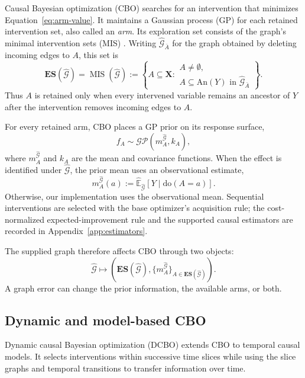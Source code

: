 \documentclass[twoside]{article}
\newcommand{\E}{\mathbb{E}}
\newcommand{\doo}{\mathrm{do}}
\newcommand{\An}{\mathrm{An}}
\newcommand{\CBO}{\textsc{CBO}}
\newcommand{\Gg}{\mathcal{G}}
\newcommand{\ES}{\mathbf{ES}}
\begin{document}
Causal Bayesian optimization (\CBO{}) \citep{agliettiCausalBayesianOptimization2020b} searches for an intervention that minimizes Equation~\eqref{eq:arm-value}. It maintains a Gaussian process (GP) for each retained intervention set, also called an \emph{arm}. Its exploration set consists of the graph's minimal intervention sets (MIS) \citep{leeStructuralCausalBandits}. Writing \(\widehat{\Gg}_{\bar A}\) for the graph obtained by deleting incoming edges to \(A\), this set is
\begin{equation}
 \ES(\widehat{\Gg})=\operatorname{MIS}(\widehat{\Gg})
 :=\left\{A\subseteq\mathbf X:
 \substack{A\ne\emptyset,\\
 A\subseteq\An(Y)\text{ in }\widehat{\Gg}_{\bar A}}\right\}.
 \label{eq:mis}
\end{equation}
Thus \(A\) is retained only when every intervened variable remains an ancestor of \(Y\) after the intervention removes incoming edges to \(A\).

For every retained arm, CBO places a GP prior on its response surface,
\begin{equation}
 f_A\sim\mathcal{GP}\!\left(m_A^{\widehat{\Gg}},k_A\right),
 \label{eq:cbo-gp}
\end{equation}
where \(m_A^{\widehat{\Gg}}\) and \(k_A\) are the mean and covariance functions. When the effect is identified under \(\widehat{\Gg}\), the prior mean uses an observational estimate,
\begin{equation}
 m_A^{\widehat{\Gg}}(a)
 :=\widehat{\E}_{\widehat{\Gg}}[Y\mid\doo(A=a)].
 \label{eq:causal-prior}
\end{equation}
Otherwise, our implementation uses the observational mean. Sequential interventions are selected with the base optimizer's acquisition rule; the cost-normalized expected-improvement rule and the supported causal estimators are recorded in Appendix~\ref{app:estimators}.

The supplied graph therefore affects CBO through two objects:
\[
 \widehat{\Gg}\longmapsto
 \left(\ES(\widehat{\Gg}),
 \{m_A^{\widehat{\Gg}}\}_{A\in\ES(\widehat{\Gg})}\right).
\]
A graph error can change the prior information, the available arms, or both.

\subsection{Dynamic and model-based CBO}

Dynamic causal Bayesian optimization (DCBO) \citep{agliettiDynamicCausalBayesian2021a} extends CBO to temporal causal models. It selects interventions within successive time slices while using the slice graphs and temporal transitions to transfer information over time.
\end{document}
